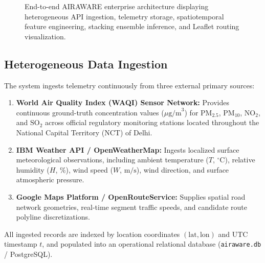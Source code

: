 \documentclass[journal]{IEEEtran}
\begin{document}
\begin{figure}[t]
\caption{End-to-end AIRAWARE enterprise architecture displaying heterogeneous API ingestion, telemetry storage, spatiotemporal feature engineering, stacking ensemble inference, and Leaflet routing visualization.}
\label{fig:architecture}
\end{figure}

\subsection{Heterogeneous Data Ingestion}
The system ingests telemetry continuously from three external primary sources:
\begin{enumerate}
    \item \textbf{World Air Quality Index (WAQI) Sensor Network:} Provides continuous ground-truth concentration values ($\mu\text{g/m}^3$) for $\text{PM}_{2.5}$, $\text{PM}_{10}$, $\text{NO}_2$, and $\text{SO}_2$ across official regulatory monitoring stations located throughout the National Capital Territory (NCT) of Delhi.
    \item \textbf{IBM Weather API / OpenWeatherMap:} Ingests localized surface meteorological observations, including ambient temperature ($T$, $^\circ\text{C}$), relative humidity ($H$, \%), wind speed ($W$, $\text{m/s}$), wind direction, and surface atmospheric pressure.
    \item \textbf{Google Maps Platform / OpenRouteService:} Supplies spatial road network geometries, real-time segment traffic speeds, and candidate route polyline discretizations.
\end{enumerate}

All ingested records are indexed by location coordinates $(\text{lat}, \text{lon})$ and UTC timestamp $t$, and populated into an operational relational database (\texttt{airaware.db} / PostgreSQL).

\end{document}
